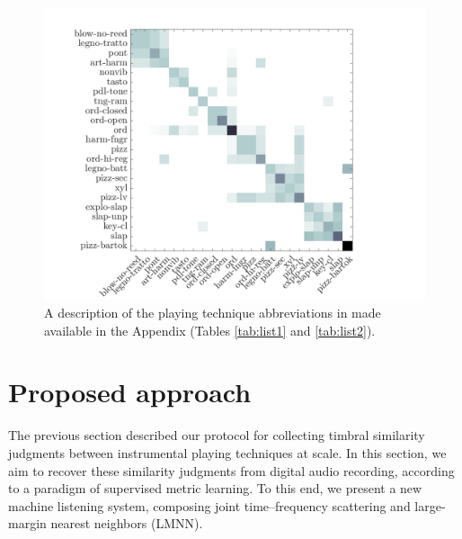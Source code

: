 \documentclass{bmcart}
\newcommand{\nmu}{}
\begin{document}
\begin{figure}
\center
\includegraphics[width = \textwidth]{figures/consensusVsPt.png}
\caption{A description of the playing technique abbreviations in made available in the Appendix (Tables \ref{tab:list1} and \ref{tab:list2}).
}
\label{fig:consensusVsPt}
\end{figure}



\section*{\nmu Proposed approach}
\label{sec:method}
The previous section described our protocol for collecting timbral similarity judgments between instrumental playing techniques at scale.
In this section, we aim to recover these similarity judgments from digital audio recording, according to a paradigm of supervised metric learning.
To this end, we present a new machine listening system, composing joint time--frequency scattering and large-margin nearest neighbors (LMNN).

\end{document}
